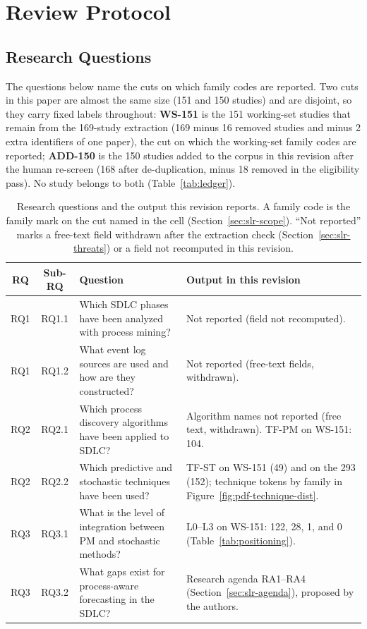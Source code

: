 \section{Review Protocol}
\label{sec:slr-protocol}

\subsection{Research Questions}
\label{sec:slr-rqs}

The questions below name the cuts on which family codes are
reported. Two cuts in this paper are almost the same size (151 and 150
studies) and are disjoint, so they carry fixed labels throughout: \textbf{WS-151} is the
151 working-set studies that remain from the 169-study extraction (169
minus 16 removed studies and minus 2 extra identifiers of one paper), the
cut on which the working-set family codes are reported; \textbf{ADD-150}
is the 150 studies added to the corpus in this revision after the human
re-screen (168 after de-duplication, minus 18 removed in the eligibility
pass). No study belongs to both (Table~\ref{tab:ledger}).

\begin{table}[htbp]
\centering
\caption{Research questions and the output this revision reports.
A family code is the family mark on the cut named in the cell
(Section~\ref{sec:slr-scope}). ``Not reported'' marks a free-text field
withdrawn after the extraction check (Section~\ref{sec:slr-threats}) or
a field not recomputed in this revision.}
\label{tab:slr-rqs}
\small
\setlength{\tabcolsep}{3pt}
\begin{tabular}{c c p{5.6cm} p{5.4cm}}
\toprule
\textbf{RQ} & \textbf{Sub-RQ} & \textbf{Question} & \textbf{Output in this revision} \\
\midrule
RQ1 & RQ1.1 & Which SDLC phases have been analyzed with process mining? &
  Not reported (field not recomputed). \\
RQ1 & RQ1.2 & What event log sources are used and how are they constructed? &
  Not reported (free-text fields, withdrawn). \\
\midrule
RQ2 & RQ2.1 & Which process discovery algorithms have been applied to SDLC? &
  Algorithm names not reported (free text, withdrawn). TF-PM on WS-151: 104. \\
RQ2 & RQ2.2 & Which predictive and stochastic techniques have been used? &
  TF-ST on WS-151 (49) and on the 293 (152); technique tokens by family in Figure~\ref{fig:pdf-technique-dist}. \\
\midrule
RQ3 & RQ3.1 & What is the level of integration between PM and stochastic
  methods? & L0--L3 on WS-151: 122, 28, 1, and 0 (Table~\ref{tab:positioning}). \\
RQ3 & RQ3.2 & What gaps exist for process-aware forecasting in the SDLC? &
  Research agenda RA1--RA4 (Section~\ref{sec:slr-agenda}), proposed by the authors. \\
\bottomrule
\end{tabular}
\end{table}


